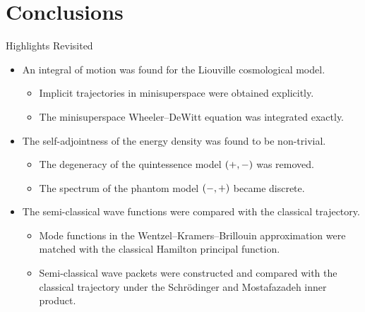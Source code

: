 \documentclass[8pt]{beamer}
\begin{document}
\section{Conclusions}

\begin{frame}%
{Highlights}%
{Revisited}
\begin{itemize}
\item An \alert{integral of motion} was found for the Liouville cosmological
model.
\begin{itemize}
\item Implicit trajectories in minisuperspace were obtained explicitly.
\item The minisuperspace Wheeler--DeWitt equation was integrated exactly.
\end{itemize}
\item The \alert{self-adjointness} of the energy density was found to be 
non-trivial.
\begin{itemize}
\item The degeneracy of the quintessence model ${\left(+,-\right)}$ was removed.
\item The spectrum of the phantom model ${\left(-,+\right)}$ became discrete.
\end{itemize}
\item The \alert{semi-classical wave functions} were compared with the 
classical trajectory.
\begin{itemize}
\item Mode functions in the Wentzel--Kramers--Brillouin approximation were 
matched with the classical Hamilton principal function.
\item Semi-classical wave packets were constructed and compared with the 
classical trajectory under the Schrödinger and Mostafazadeh inner product.
\end{itemize}
\end{itemize}
\end{frame}

\end{document}
